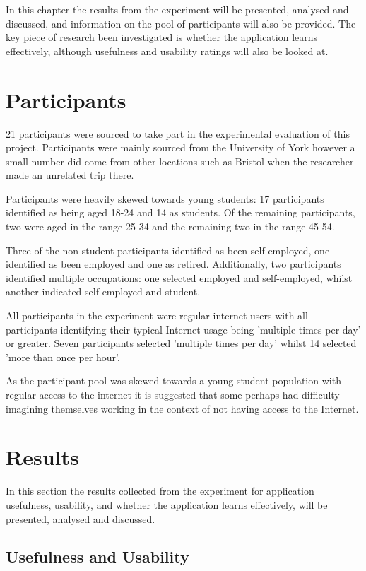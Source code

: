 \documentclass[authoryearcitations]{UoYCSproject}
\begin{document}
In this chapter the results from the experiment will be presented, analysed and discussed, and information on the pool of participants will also be provided. The key piece of research been investigated is whether the application learns effectively, although usefulness and usability ratings will also be looked at.

\section{Participants}
\label{sec:participants}

21 participants were sourced to take part in the experimental evaluation of this project. Participants were mainly sourced from the University of York however a small number did come from other locations such as Bristol when the researcher made an unrelated trip there.

Participants were heavily skewed towards young students: 17 participants identified as being aged 18-24 and 14 as students. Of the remaining participants, two were aged in the range 25-34 and the remaining two in the range 45-54.

Three of the non-student participants identified as been self-employed, one identified as been employed and one as retired. Additionally, two participants identified multiple occupations: one selected employed and self-employed, whilst another indicated self-employed and student.

All participants in the experiment were regular internet users with all participants identifying their typical Internet usage being 'multiple times per day' or greater. Seven participants selected 'multiple times per day' whilst 14 selected 'more than once per hour'.

As the participant pool was skewed towards a young student population with regular access to the internet it is suggested that some perhaps had difficulty imagining themselves working in the context of not having access to the Internet. 

\section{Results}
\label{sec:results}

In this section the results collected from the experiment for application usefulness, usability, and whether the application learns effectively, will be presented, analysed and discussed.

\subsection{Usefulness and Usability}
\label{subsec:resultsUsefulnessAndUsability}
\end{document}
